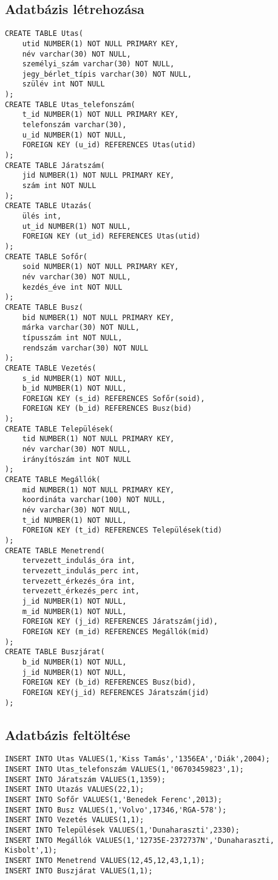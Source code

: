 \documentclass[12pt]{article}
\begin{document}
\subsection{Adatbázis  létrehozása}
\begin{verbatim}
CREATE TABLE Utas(
    utid NUMBER(1) NOT NULL PRIMARY KEY,
    név varchar(30) NOT NULL,
    személyi_szám varchar(30) NOT NULL,
    jegy_bérlet_típis varchar(30) NOT NULL,
    szülév int NOT NULL
);
CREATE TABLE Utas_telefonszám(
    t_id NUMBER(1) NOT NULL PRIMARY KEY,
    telefonszám varchar(30),
    u_id NUMBER(1) NOT NULL,
    FOREIGN KEY (u_id) REFERENCES Utas(utid)
);
CREATE TABLE Járatszám(
    jid NUMBER(1) NOT NULL PRIMARY KEY,
    szám int NOT NULL
);
CREATE TABLE Utazás(
    ülés int,
    ut_id NUMBER(1) NOT NULL,
    FOREIGN KEY (ut_id) REFERENCES Utas(utid)
);
CREATE TABLE Sofőr(
    soid NUMBER(1) NOT NULL PRIMARY KEY,
    név varchar(30) NOT NULL,
    kezdés_éve int NOT NULL
);
CREATE TABLE Busz(
    bid NUMBER(1) NOT NULL PRIMARY KEY,
    márka varchar(30) NOT NULL,
    típusszám int NOT NULL,
    rendszám varchar(30) NOT NULL
);
CREATE TABLE Vezetés(
    s_id NUMBER(1) NOT NULL,
    b_id NUMBER(1) NOT NULL,
    FOREIGN KEY (s_id) REFERENCES Sofőr(soid),
    FOREIGN KEY (b_id) REFERENCES Busz(bid)
);
CREATE TABLE Települések(
    tid NUMBER(1) NOT NULL PRIMARY KEY,
    név varchar(30) NOT NULL,
    irányítószám int NOT NULL
);
CREATE TABLE Megállók(
    mid NUMBER(1) NOT NULL PRIMARY KEY,
    koordináta varchar(100) NOT NULL,
    név varchar(30) NOT NULL,
    t_id NUMBER(1) NOT NULL,
    FOREIGN KEY (t_id) REFERENCES Települések(tid)
);
CREATE TABLE Menetrend(
    tervezett_indulás_óra int,
    tervezett_indulás_perc int,
    tervezett_érkezés_óra int,
    tervezett_érkezés_perc int,
    j_id NUMBER(1) NOT NULL,
    m_id NUMBER(1) NOT NULL,
    FOREIGN KEY (j_id) REFERENCES Járatszám(jid),
    FOREIGN KEY (m_id) REFERENCES Megállók(mid)
);
CREATE TABLE Buszjárat(
    b_id NUMBER(1) NOT NULL,
    j_id NUMBER(1) NOT NULL,
    FOREIGN KEY (b_id) REFERENCES Busz(bid),
    FOREIGN KEY(j_id) REFERENCES Járatszám(jid)
);
\end{verbatim}
\newpage
\subsection{Adatbázis feltöltése}
\begin{verbatim}
INSERT INTO Utas VALUES(1,'Kiss Tamás','1356EA','Diák',2004);
INSERT INTO Utas_telefonszám VALUES(1,'06703459823',1);
INSERT INTO Járatszám VALUES(1,1359);
INSERT INTO Utazás VALUES(22,1);
INSERT INTO Sofőr VALUES(1,'Benedek Ferenc',2013);
INSERT INTO Busz VALUES(1,'Volvo',17346,'RGA-578');
INSERT INTO Vezetés VALUES(1,1);
INSERT INTO Települések VALUES(1,'Dunaharaszti',2330);
INSERT INTO Megállók VALUES(1,'12735E-2372737N','Dunaharaszti, Kisbolt',1);
INSERT INTO Menetrend VALUES(12,45,12,43,1,1);
INSERT INTO Buszjárat VALUES(1,1);
\end{verbatim}
\end{document}

